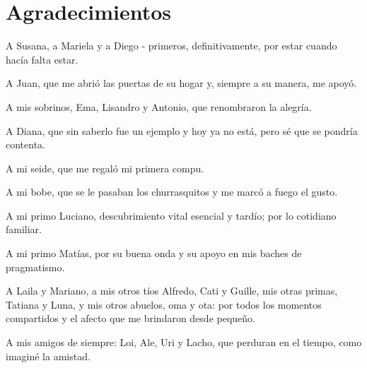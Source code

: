 \chapter*{Agradecimientos}

\noindent A Susana, a Mariela y a Diego - primeros, definitivamente, por estar cuando hacía falta estar. \newline

\medskip

\noindent A Juan, que me abrió las puertas de su hogar y, siempre a su manera, me apoyó. \newline

\medskip

\noindent A mis sobrinos, Ema, Lisandro y Antonio, que renombraron la alegría.  \newline

\medskip

\noindent A Diana, que sin saberlo fue un ejemplo y hoy ya no está, pero sé que se pondría contenta. \newline

\medskip

\noindent A mi seide, que me regaló mi primera compu.  \newline

\medskip

\noindent A mi bobe, que se le pasaban los churrasquitos y me marcó a fuego el gusto. \newline

\medskip

\noindent A mi primo Luciano, descubrimiento vital esencial y tardío; por lo cotidiano familiar. \newline

\medskip

\noindent A mi primo Matías, por su buena onda y su apoyo en mis baches de pragmatismo. \newline

\medskip

\noindent A Laila y Mariano, a mis otros tíos Alfredo, Cati y Guille, mis otras primas, Tatiana y Luna, y mis otros abuelos, oma y ota: por todos los momentos compartidos y el afecto que me brindaron desde pequeño. \newline

\medskip

\noindent A mis amigos de siempre: Loi, Ale, Uri y Lacho, que perduran en el tiempo, como imaginé la amistad. \newline

